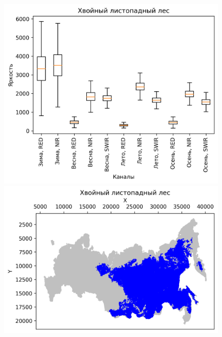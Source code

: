 \documentclass[14pt, a4paper, oneside]{extarticle}
\begin{document}
\begin{figure}[H]
    \centering
    \includegraphics[]{class-4-boxplot}
    \includegraphics[]{class-4-map}
\end{figure}
\end{document}
